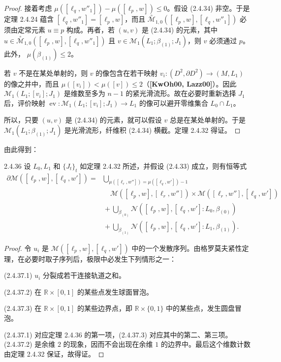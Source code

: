 \begin{proof}
接着考虑 $\mu([\ell_q,w''_1])-\mu([\ell_p,w])\leq0$。假设 (2.4.34) 非空。于是定理 2.4.24 蕴含
$[\ell_q,w''_1]=[\ell_p,w]$，而且
$\overset{\circ}{\mathcal M}_{1,0}([\ell_p,w],[\ell_q,w''_1])$ 必须由定常元素
$u\equiv p$ 构成。再者，若 $(u,v)$ 是 (2.4.34) 的元素，其中
$u\in\overset{\circ}{\mathcal M}_{1,0}([\ell_p,w],[\ell_q,w''_1])$ 且
$v\in\mathcal M_1(L_1;\beta_{(1)};J_1)$，则 $v$ 必须通过 $p$。此外，
$\mu(\beta_{(1)})\leq2$。

若 $v$ 不是在某处单射的，则 $v$ 的像包含在若干映射
$v_i:(D^2,\partial D^2)\to(M,L_1)$ 的像之并中，而且
$\mu([v_i])<\mu([v])\leq2$（\textbf{[KwOh00, Lazz00]}）。因此
$\mathcal M_1(L_1;[v_i];J_1)$ 是维数至多为 $n-1$ 的紧光滑流形。故在必要时重新选择 $J_1$ 后，评价映射
$\operatorname{ev}:\mathcal M_1(L_1;[v_i];J_1)\to L_1$ 的像可以避开零维集合
$L_0\cap L_1$。

所以，只要 $(u,v)$ 是 (2.4.34) 的元素，就可以假设 $v$ 总是在某处单射的。于是
$\mathcal M_1(L_1;\beta_{(1)};J_1)$ 是光滑流形，纤维积 (2.4.34) 横截。定理 2.4.32 得证。
\end{proof}

由此得到：

\begin{theorem}{2.4.36}\label{thm:2-4-36}
设 $L_0,L_1$ 和 $\{J_t\}_t$ 如定理 2.4.32 所述，并假设 (2.4.33) 成立，则有恒等式
\begin{align*}
  \partial\mathcal M([\ell_p,w],[\ell_q,w'])
  ={}&\bigcup_{\mu([\ell_r,w''])=\mu([\ell_q,w'])-1}
    \\[-2pt]
  &\quad
    \mathcal M([\ell_p,w],[\ell_r,w''])
    \times\mathcal M([\ell_r,w''],[\ell_q,w'])\\
  &{}+\bigcup_{\beta_{(0)}}
    \mathcal N([\ell_p,w],[\ell_q,w']:L_0,\beta_{(0)})\\
  &{}+\bigcup_{\beta_{(1)}}
    \mathcal N([\ell_p,w],[\ell_q,w']:L_1,\beta_{(1)}).
\end{align*}
\end{theorem}

\begin{proof}
令 $u_i$ 是 $\mathcal M([\ell_p,w],[\ell_q,w'])$ 中的一个发散序列。由格罗莫夫紧性定理，在必要时取子序列后，极限中必发生下列情形之一：

\par\smallskip\noindent\textup{(2.4.37.1)}\quad
$u_i$ 分裂成若干连接轨道之和。

\par\smallskip\noindent\textup{(2.4.37.2)}\quad
在 $\mathbb R\times[0,1]$ 的某些点发生球面冒泡。

\par\smallskip\noindent\textup{(2.4.37.3)}\quad
在 $\mathbb R\times[0,1]$ 的某些边界点，即 $\mathbb R\times\{0,1\}$ 中的某些点，发生圆盘冒泡。

(2.4.37.1) 对应定理 2.4.36 的第一项，(2.4.37.3) 对应其中的第二、第三项。(2.4.37.2) 是余维 $2$ 的现象，因而不会出现在余维 $1$ 的边界中。最后这个维数计数由定理 2.4.32 保证，故得证。
\end{proof}

